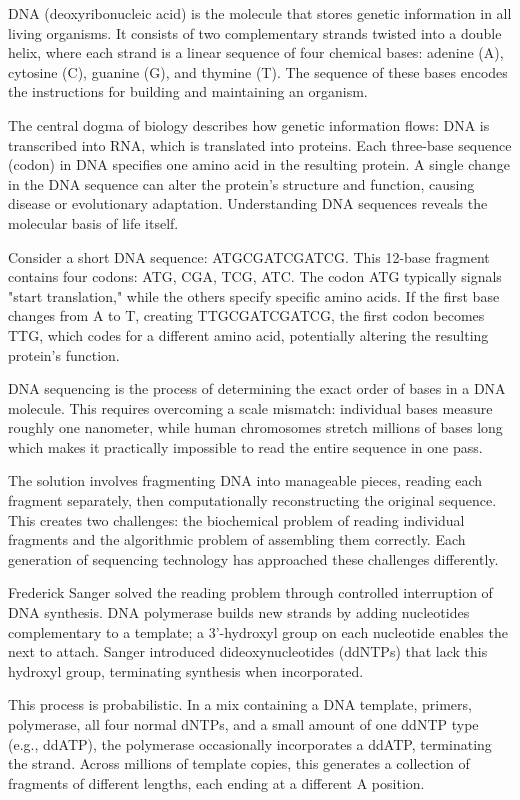 DNA (deoxyribonucleic acid) is the molecule that stores genetic information in all living organisms. It consists of two complementary strands twisted into a double helix, where each strand is a linear sequence of four chemical bases: adenine (A), cytosine (C), guanine (G), and thymine (T). The sequence of these bases encodes the instructions for building and maintaining an organism.

The central dogma of biology describes how genetic information flows: DNA is transcribed into RNA, which is translated into proteins. Each three-base sequence (codon) in DNA specifies one amino acid in the resulting protein. A single change in the DNA sequence can alter the protein's structure and function, causing disease or evolutionary adaptation. Understanding DNA sequences reveals the molecular basis of life itself.

Consider a short DNA sequence: ATGCGATCGATCG. This 12-base fragment contains four codons: ATG, CGA, TCG, ATC. The codon ATG typically signals "start translation," while the others specify specific amino acids. If the first base changes from A to T, creating TTGCGATCGATCG, the first codon becomes TTG, which codes for a different amino acid, potentially altering the resulting protein's function.

DNA sequencing is the process of determining the exact order of bases in a DNA molecule. This requires overcoming a scale mismatch: individual bases measure roughly one nanometer, while human chromosomes stretch millions of bases long which makes it practically impossible to read the entire sequence in one pass.

The solution involves fragmenting DNA into manageable pieces, reading each fragment separately, then computationally reconstructing the original sequence. This creates two challenges: the biochemical problem of reading individual fragments and the algorithmic problem of assembling them correctly. Each generation of sequencing technology has approached these challenges differently.

Frederick Sanger solved the reading problem through controlled interruption of DNA synthesis. DNA polymerase builds new strands by adding nucleotides complementary to a template; a 3'-hydroxyl group on each nucleotide enables the next to attach. Sanger introduced dideoxynucleotides (ddNTPs) that lack this hydroxyl group, terminating synthesis when incorporated.

This process is probabilistic. In a mix containing a DNA template, primers, polymerase, all four normal dNTPs, and a small amount of one ddNTP type (e.g., ddATP), the polymerase occasionally incorporates a ddATP, terminating the strand. Across millions of template copies, this generates a collection of fragments of different lengths, each ending at a different A position.


